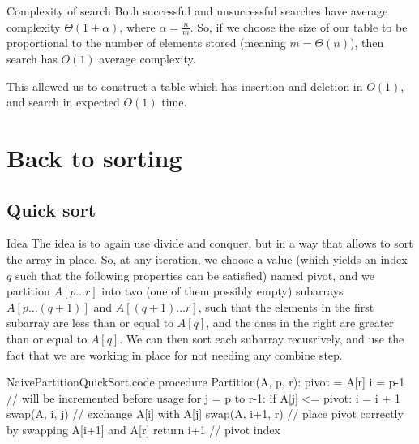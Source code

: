 \documentclass[a4paper]{article}
\begin{document}
\begin{parag}{Complexity of search}
    Both successful and unsuccessful searches have average complexity $\Theta\left(1 + \alpha\right)$, where $\alpha = \frac{n}{m}$. So, if we choose the size of our table to be proportional to the number of elements stored (meaning $m = \Theta\left(n\right)$), then search has $O\left(1\right)$ average complexity.

    This allowed us to construct a table which has insertion and deletion in $O\left(1\right)$, and search in expected $O\left(1\right)$ time.
\end{parag}

\section{Back to sorting}
\subsection{Quick sort}
\begin{parag}{Idea}
    The idea is to again use divide and conquer, but in a way that allows to sort the array in place. So, at any iteration, we choose a value (which yields an index $q$ such that the following properties can be satisfied) named pivot, and we partition $A\left[p\ldots r\right]$ into two (one of them possibly empty) subarrays $A\left[p\ldots \left(q+1\right)\right]$ and $A\left[\left(q+1\right) \ldots r\right]$, such that the elements in the first subarray are less than or equal to $A\left[q\right]$, and the ones in the right are greater than or equal to $A\left[q\right]$. We can then sort each subarray recusrively, and use the fact that we are working in place for not needing any combine step.

\end{parag}


\begin{filecontents*}[overwrite]{NaivePartitionQuickSort.code}
procedure Partition(A, p, r):
    pivot = A[r]
    i = p-1  // will be incremented before usage
    for j = p to r-1:
        if A[j] <= pivot:
            i = i + 1
            swap(A, i, j)  // exchange A[i] with A[j]
    swap(A, i+1, r)  // place pivot correctly by swapping A[i+1] and A[r]
    return i+1  // pivot index
\end{filecontents*}
\end{document}
